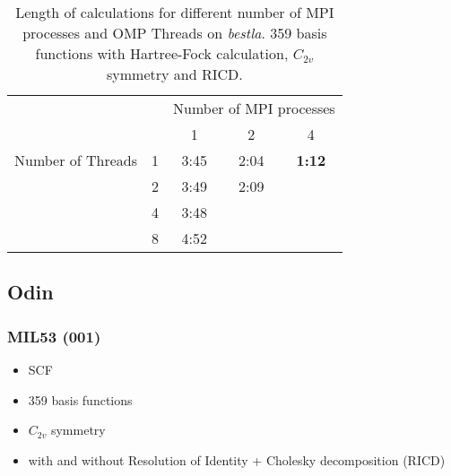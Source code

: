 \documentclass[12pt,a4paper,bibliography=totocnumbered,listof=totocnumbered]{scrartcl}
\begin{document}
\begin{table}[H]
    \caption{Length of calculations for different number of MPI processes and OMP Threads on \emph{bestla}. 359 basis functions with Hartree-Fock calculation, $C_{2v}$ symmetry and RICD.}
    \label{T:duration}
    \begin{tabular}{ccccc}
        \toprule
        &     & \multicolumn{3}{c}{Number of MPI processes} \\
        \cmidrule{3-5}
        &         &    1     &     2     &    4     \\ 
        \midrule
        Number of Threads    &   1           &   3:45   &    2:04     &     \textbf{1:12}\\ 
                             &   2           &   3:49   &   2:09     &         \\ 
                             &   4           &   3:48   &            &         \\ 
                             &   8           &   4:52       &            &         \\ 
        \bottomrule
    \end{tabular}
\end{table}




\subsection{Odin}
\subsubsection{MIL53 (001)}
\begin{itemize}
    \item SCF
    \item 359 basis functions
    \item $C_{2v}$ symmetry
    \item with and without Resolution of Identity + Cholesky decomposition (RICD)
\end{itemize}
\end{document}
